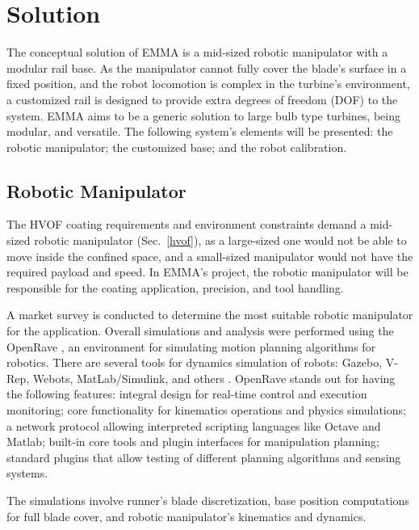 \section{Solution}\label{solution}


The conceptual solution of EMMA is a mid-sized robotic manipulator with a
modular rail base. As the manipulator cannot fully cover the blade's surface in
a fixed position, and the robot locomotion is complex in the turbine's
environment, a customized rail is designed to provide extra degrees of
freedom (DOF) to the system. EMMA aims to be a generic solution to large bulb
type turbines, being modular, and versatile. The following system's elements
will be presented: the robotic manipulator; the customized base; and the robot
calibration.


\subsection{Robotic Manipulator}\label{manipulator}
The HVOF coating requirements and environment constraints demand a mid-sized
robotic manipulator (Sec.~\ref{hvof}), as a large-sized one would not
be able to move inside the confined space, and a small-sized manipulator would not
have the required payload and speed. In EMMA's project, the
robotic manipulator will be responsible for the coating application, precision, and tool handling.

A market survey is conducted to determine the most suitable robotic
manipulator for the application. Overall simu\-lations and analysis were performed using the OpenRave \cite{diankov2008openrave},
an environment for simulating motion planning algorithms for robotics. There are
several tools for dynamics simulation of robots: Gazebo, V-Rep,
Webots, MatLab/Simulink, and others%
. OpenRave stands out for having the following features: integral design for
real-time control and execution monitoring; core functionality for kinematics operations and
physics simulations; a network protocol allowing interpreted scripting languages
like Octave and Matlab; built-in core tools and plugin interfaces for
manipulation planning; standard plugins that allow testing of different planning
algorithms and sensing systems.

The simulations involve runner's blade discretization, base
position computations for full blade cover, and robotic manipulator's kinematics
and dynamics. 

